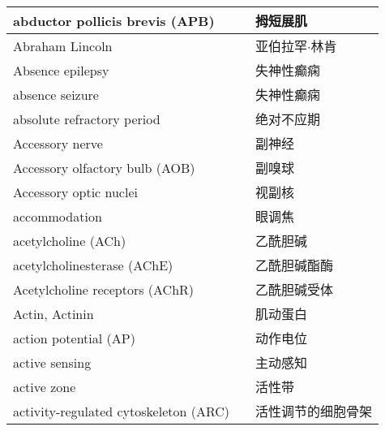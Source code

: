 \begin{longtable}{lll}
 	\midrule
 	abductor pollicis brevis (APB)     && 拇短展肌   \\
 	
 	\midrule
 	Abraham Lincoln     && 亚伯拉罕$\cdot$林肯   \\
 	
 	\midrule
 	Absence epilepsy     && 失神性癫痫   \\
 	
 	\midrule
 	absence seizure     && 失神性癫痫   \\
 	
 	\midrule
 	absolute refractory period     && 绝对不应期   \\
 	
 	\midrule
 	Accessory nerve   &&  副神经   \\
 	
 	\midrule
 	Accessory olfactory bulb  (AOB) &&  副嗅球   \\
 	
 	\midrule
 	Accessory optic nuclei   && 视副核   \\
 	
 	\midrule
 	accommodation   && 眼调焦   \\
 
	\midrule
	acetylcholine (ACh)     && 乙酰胆碱   \\
	
	\midrule
	acetylcholinesterase (AChE)     && 乙酰胆碱酯酶   \\
	
	\midrule
	Acetylcholine receptors (AChR)    && 乙酰胆碱受体   \\
	
	\midrule
	Actin, Actinin  && 肌动蛋白	   \\
	
	\midrule
	action potential  (AP)  && 动作电位   \\
	
	\midrule
	active sensing  && 主动感知   \\
	
	\midrule
	active zone  && 活性带   \\
	
	\midrule
	activity-regulated cytoskeleton (ARC) && 活性调节的细胞骨架   \\
	

\end{longtable}
